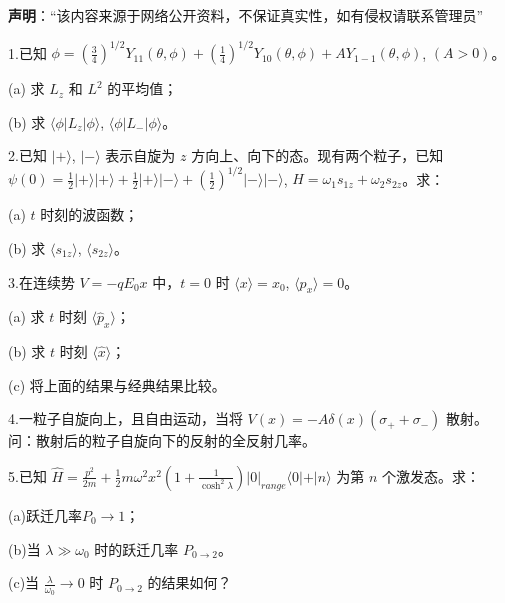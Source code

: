 
\textbf{声明}：“该内容来源于网络公开资料，不保证真实性，如有侵权请联系管理员”

1.已知 $\phi = \left(\frac{3}{4}\right)^{1/2} Y_{11}(\theta, \phi) + \left(\frac{1}{4}\right)^{1/2} Y_{10}(\theta, \phi) + A Y_{1-1}(\theta, \phi)$, $(A > 0)$。

(a) 求 $L_z$ 和 $L^2$ 的平均值；

(b) 求 $\langle \phi | L_z | \phi \rangle$, $\langle \phi | L_- | \phi \rangle$。

2.已知 $|+\rangle$, $|-\rangle$ 表示自旋为 $z$ 方向上、向下的态。现有两个粒子，已知 $\psi(0) = \frac{1}{2} |+\rangle |+\rangle + \frac{1}{2} |+\rangle |-\rangle + (\frac{1}{2})^{1/2} |-\rangle |-\rangle$, $H = \omega_1 s_{1z} + \omega_2 s_{2z}$。求：

(a) $t$ 时刻的波函数；

(b) 求 $\langle s_{1z} \rangle$, $\langle s_{2z} \rangle$。

3.在连续势 $V = -q E_0 x$ 中，$t = 0$ 时 $\langle x \rangle = x_0$, $\langle p_x \rangle = 0$。

(a) 求 $t$ 时刻 $\langle \hat p_x \rangle$；

(b) 求 $t$ 时刻 $\langle \hat x \rangle$；

(c) 将上面的结果与经典结果比较。

4.一粒子自旋向上，且自由运动，当将 $V(x) = -A \delta(x)(\sigma_+ + \sigma_-)$ 散射。问：散射后的粒子自旋向下的反射的全反射几率。

5.已知 $\hat{H} = \frac{p^2}{2m} + \frac{1}{2} m \omega^2 x^2 \left(1 + \frac{1}{\cosh^2\lambda}\right) |0|_{range} \langle 0| + |n\rangle$ 为第 $n$ 个激发态。求：

(a)跃迁几率$P_0\to 1$；

(b)当 $\lambda \gg \omega_0$ 时的跃迁几率 $P_{0 \rightarrow 2}$。

(c)当 $\frac{\lambda}{\omega_0} \rightarrow 0$ 时 $P_{0 \rightarrow 2}$ 的结果如何？

